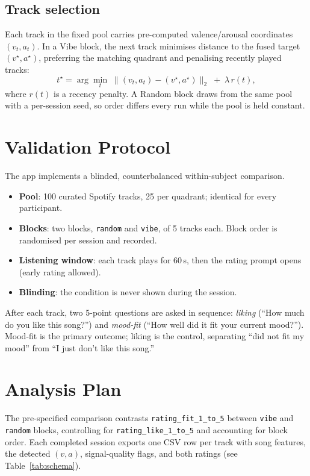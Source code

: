 \documentclass[11pt]{article}
\newcommand{\valence}{\ensuremath{v}}
\newcommand{\arousal}{\ensuremath{a}}
\begin{document}
\subsection{Track selection}
Each track in the fixed pool carries pre-computed valence/arousal coordinates
$(\valence_t, \arousal_t)$. In a Vibe block, the next track minimises distance to
the fused target $(\valence^\star, \arousal^\star)$, preferring the matching
quadrant and penalising recently played tracks:
\begin{equation}
t^\star = \arg\min_{t}\;
\big\lVert (\valence_t, \arousal_t) - (\valence^\star, \arousal^\star) \big\rVert_2
\;+\; \lambda\, r(t),
\end{equation}
where $r(t)$ is a recency penalty. A Random block draws from the same pool with a
per-session seed, so order differs every run while the pool is held constant.

\section{Validation Protocol}
The app implements a blinded, counterbalanced within-subject comparison.
\begin{itemize}[leftmargin=1.4em]
  \item \textbf{Pool}: 100 curated Spotify tracks, 25 per quadrant; identical for
  every participant.
  \item \textbf{Blocks}: two blocks, \texttt{random} and \texttt{vibe}, of 5
  tracks each. Block order is randomised per session and recorded.
  \item \textbf{Listening window}: each track plays for $60\,$s, then the rating
  prompt opens (early rating allowed).
  \item \textbf{Blinding}: the condition is never shown during the session.
\end{itemize}

After each track, two 5-point questions are asked in sequence: \emph{liking}
(``How much do you like this song?'') and \emph{mood-fit} (``How well did it fit
your current mood?''). Mood-fit is the primary outcome; liking is the control,
separating ``did not fit my mood'' from ``I just don't like this song.''

\section{Analysis Plan}
The pre-specified comparison contrasts \texttt{rating\_fit\_1\_to\_5} between
\texttt{vibe} and \texttt{random} blocks, controlling for
\texttt{rating\_like\_1\_to\_5} and accounting for block order. Each completed
session exports one CSV row per track with song features, the detected
$(\valence,\arousal)$, signal-quality flags, and both ratings (see
Table~\ref{tab:schema}).
\end{document}
